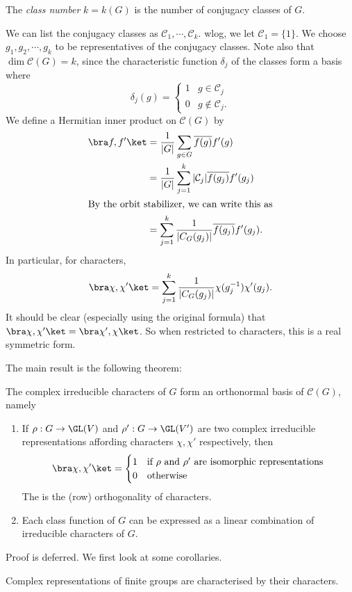 \documentclass[a4paper]{article}
\begin{document}
\begin{defi}
  The \emph{class number} $k = k(G)$ is the number of conjugacy classes of $G$.
\end{defi}
We can list the conjugacy classes as $\mathcal{C}_1, \cdots, \mathcal{C}_k$. wlog, we let $\mathcal{C}_1 = \{1\}$. We choose $g_1, g_2, \cdots, g_k$ to be representatives of the conjugacy classes. Note also that $\dim \mathcal{C}(G) = k$, since the characteristic function $\delta_j$ of the classes form a basis where
\[
  \delta_j(g) =
  \begin{cases}
    1 & g \in \mathcal{C}_j\\
    0 & g \not\in \mathcal{C}_j.
  \end{cases}
\]
We define a Hermitian inner product on $\mathcal{C}(G)$ by
\begin{align*}
  \bra f, f'\ket &= \frac{1}{|G|} \sum_{g \in G}\overline{f(g)} f'(g) \\
  &= \frac{1}{|G|} \sum_{j = 1}^k |\mathcal{C}_j|\overline{f(g_j)} f'(g_j)\\
  \intertext{By the orbit stabilizer, we can write this as}
  &= \sum_{j = 1}^k \frac{1}{|C_G(g_j)|} \overline{f(g_j)} f'(g_j).
\end{align*}
In particular, for characters,
\[
  \bra \chi, \chi'\ket = \sum_{j = 1}^k \frac{1}{|C_G(g_j)|} \chi(g_j^{-1}) \chi'(g_j).
\]
It should be clear (especially using the original formula) that $\bra \chi, \chi'\ket = \bra \chi', \chi\ket$. So when restricted to characters, this is a real symmetric form.

The main result is the following theorem:
\begin{thm}
  The complex irreducible characters of $G$ form an orthonormal basis of $\mathcal{C}(G)$, namely
  \begin{enumerate}
    \item If $\rho: G \to \GL(V)$ and $\rho': G \to \GL(V')$ are two complex irreducible representations affording characters $\chi, \chi'$ respectively, then
      \[
        \bra \chi, \chi'\ket =
        \begin{cases}
          1 & \text{if $\rho$ and $\rho'$ are isomorphic representations}\\
          0 & \text{otherwise}
        \end{cases}
      \]
      The is the (row) orthogonality of characters.
    \item Each class function of $G$ can be expressed as a linear combination of irreducible characters of $G$.
  \end{enumerate}
\end{thm}
Proof is deferred. We first look at some corollaries.
\begin{cor}
  Complex representations of finite groups are characterised by their characters.
\end{cor}
\end{document}
